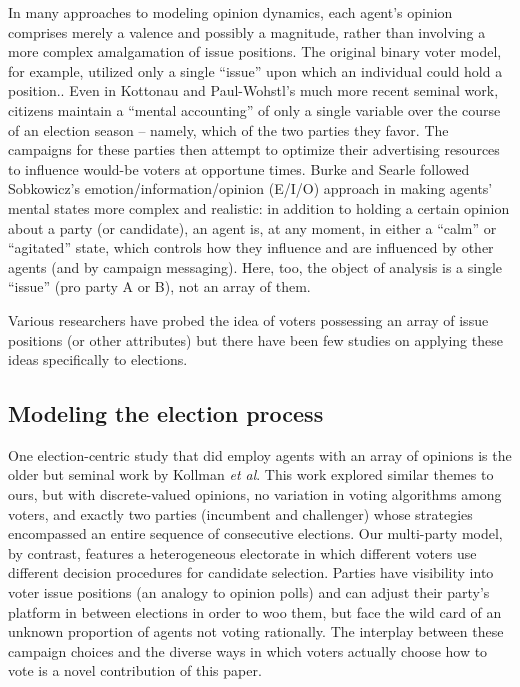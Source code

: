 In many approaches to modeling opinion dynamics, each agent's opinion comprises
merely a valence and possibly a magnitude, rather than involving a more complex
amalgamation of issue positions. The original binary voter model, for example,
utilized only a single ``issue'' upon which an individual could hold a
position.\cite{holley_ergodic_1975,clifford_model_1973}. Even in Kottonau and
Paul-Wohstl's much more recent seminal work\cite{kottonau_simulating_2004},
citizens maintain a ``mental accounting'' of only a single variable over the
course of an election season -- namely, which of the two parties they favor.
The campaigns for these parties then attempt to optimize their advertising
resources to influence would-be voters at opportune times. Burke and
Searle\cite{burke_quantitatively_2022} followed Sobkowicz's
emotion/information/opinion (E/I/O) approach\cite{sobkowicz_quantitative_2016}
in making agents' mental states more complex and realistic: in addition to
holding a certain opinion about a party (or candidate), an agent is, at any
moment, in either a ``calm'' or ``agitated'' state, which controls how they
influence and are influenced by other agents (and by campaign messaging). Here,
too, the object of analysis is a single ``issue'' (pro party A or B), not an
array of them.

Various researchers have probed the idea of voters possessing an array of issue
positions (or other
attributes)\cite{axelrod_dissemination_1997,fortunato_vector_2005,weisbuch_meet_2002,schweighofer_agent-based_2020,jung_cultural_2021,sirbu_opinion_2013}
but there have been few studies on applying these ideas specifically to
elections.

\subsection{Modeling the election process}

One election-centric study that did employ agents with an array of opinions is
the older but seminal work by Kollman \textit{et
al}\cite{kollman_adaptive_1992}. This work explored similar themes to ours, but
with discrete-valued opinions, no variation in voting algorithms among voters,
and exactly two parties (incumbent and challenger) whose strategies encompassed
an entire sequence of consecutive elections. Our multi-party model, by
contrast, features a heterogeneous electorate in which different voters use
different decision procedures for candidate selection. Parties have visibility
into voter issue positions (an analogy to opinion polls) and can adjust their
party's platform in between elections in order to woo them, but face the wild
card of an unknown proportion of agents not voting rationally. The interplay
between these campaign choices and the diverse ways in which voters actually
choose how to vote is a novel contribution of this paper.


